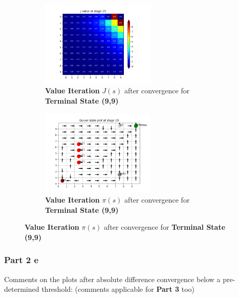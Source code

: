 \begin{figure}[h]
\begin{subfigure}
\centering
\includegraphics[angle=0,width=0.6\textwidth]{hw4/logs/value_iter_t=99_N=20/J-heatmap-19.png}
\caption{ \textbf{Value Iteration} $J(s)$  after convergence for \textbf{Terminal State (9,9)}}
\end{subfigure}

\begin{subfigure}
\centering
\includegraphics[angle=0,width=0.6\textwidth]{hw4/logs/value_iter_t=99_N=20/quiver-19.png}
\caption{ \textbf{Value Iteration}  $\pi(s)$ after convergence for \textbf{Terminal State (9,9)}}
\end{subfigure}
\end{figure}

\subsubsection{Part 2 e}

Comments on the plots after absolute difference convergence below a pre-determined threshold: (comments applicable for \textbf{Part 3} too)

